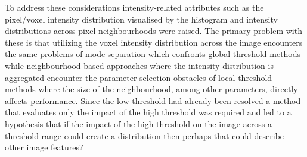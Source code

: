 To address these considerations intensity-related attributes such as the pixel/voxel intensity distribution visualised by the histogram and intensity distributions across pixel neighbourhoods were raised. The primary problem with these is that utilizing the voxel intensity distribution across the image encounters the same problems of mode separation which confronts global threshold methods while neighbourhood-based approaches where the intensity distribution is aggregated encounter the parameter selection obstacles of local threshold methods where the size of the neighbourhood, among other parameters, directly affects performance. Since the low threshold had already been resolved a method that evaluates only the impact of the high threshold was required and led to a hypothesis that if the impact of the high threshold on the image across a threshold range could create a distribution then perhaps that could describe other image features?

